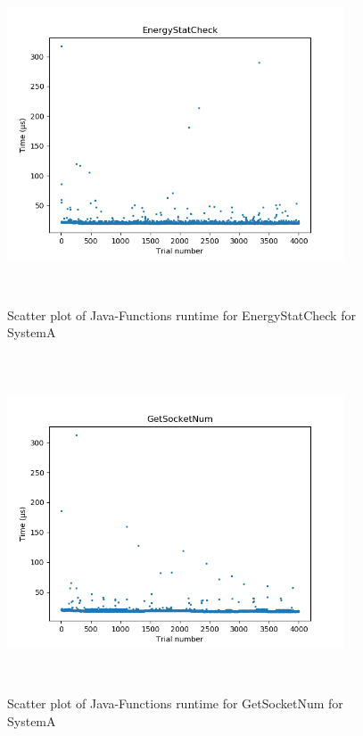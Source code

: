 \begin{figure}[H]
	\centering
	\includegraphics[width=10cm,height=10cm,keepaspectratio]{RuntimeResults_SystemA/JavaFunctions/EnergyStatCheck_scatter.png}
	\caption{Scatter plot of Java-Functions runtime for EnergyStatCheck for SystemA}
	\label{fig:Java-Functions|EnergyStatCheck|SystemA}
\end{figure}

\begin{figure}[H]
	\centering
	\includegraphics[width=10cm,height=10cm,keepaspectratio]{RuntimeResults_SystemA/JavaFunctions/GetSocketNum_scatter.png}
	\caption{Scatter plot of Java-Functions runtime for GetSocketNum for SystemA}
	\label{fig:Java-Functions|GetSocketNum|SystemA}
\end{figure}

